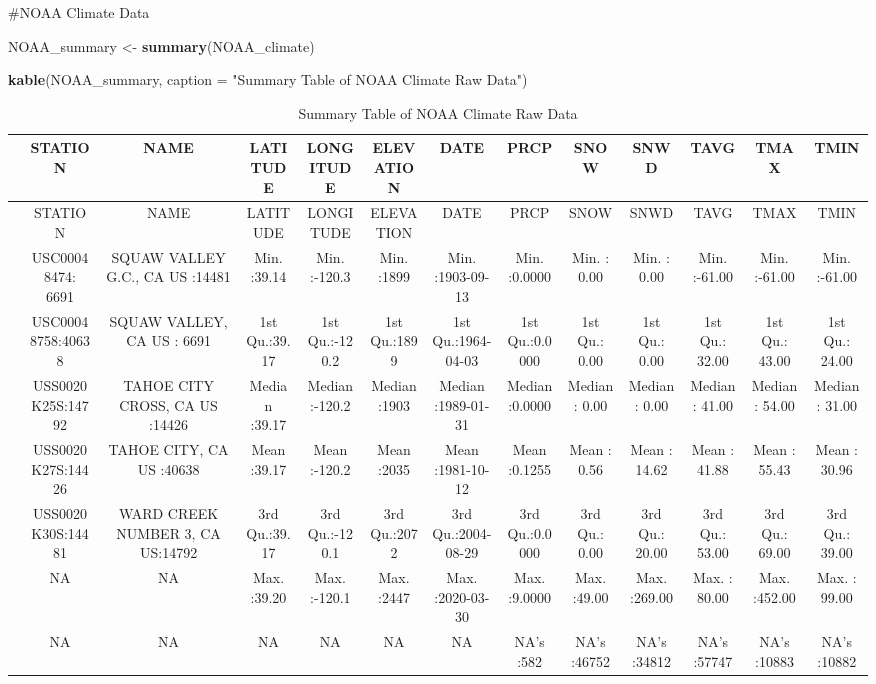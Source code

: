 \documentclass[]{article}
\newenvironment{Shaded}{\begin{snugshade}}{\end{snugshade}}
\newcommand{\DataTypeTok}[1]{\textcolor[rgb]{0.13,0.29,0.53}{#1}}
\newcommand{\KeywordTok}[1]{\textcolor[rgb]{0.13,0.29,0.53}{\textbf{#1}}}
\newcommand{\NormalTok}[1]{#1}
\newcommand{\StringTok}[1]{\textcolor[rgb]{0.31,0.60,0.02}{#1}}
\begin{document}
\#NOAA Climate Data

\begin{Shaded}
\begin{Highlighting}[]
\NormalTok{NOAA_summary <-}\StringTok{ }\KeywordTok{summary}\NormalTok{(NOAA_climate)}

\KeywordTok{kable}\NormalTok{(NOAA_summary, }\DataTypeTok{caption =} \StringTok{"Summary Table of NOAA Climate Raw Data"}\NormalTok{) }
\end{Highlighting}
\end{Shaded}

\begin{longtable}[]{@{}lcccccccccccc@{}}
\caption{Summary Table of NOAA Climate Raw Data}\tabularnewline
\toprule
& STATION & NAME & LATITUDE & LONGITUDE & ELEVATION & DATE & PRCP & SNOW
& SNWD & TAVG & TMAX & TMIN\tabularnewline
\midrule
\endfirsthead
\toprule
& STATION & NAME & LATITUDE & LONGITUDE & ELEVATION & DATE & PRCP & SNOW
& SNWD & TAVG & TMAX & TMIN\tabularnewline
\midrule
\endhead
& USC00048474: 6691 & SQUAW VALLEY G.C., CA US :14481 & Min. :39.14 &
Min. :-120.3 & Min. :1899 & Min. :1903-09-13 & Min. :0.0000 & Min. :
0.00 & Min. : 0.00 & Min. :-61.00 & Min. :-61.00 & Min.
:-61.00\tabularnewline
& USC00048758:40638 & SQUAW VALLEY, CA US : 6691 & 1st Qu.:39.17 & 1st
Qu.:-120.2 & 1st Qu.:1899 & 1st Qu.:1964-04-03 & 1st Qu.:0.0000 & 1st
Qu.: 0.00 & 1st Qu.: 0.00 & 1st Qu.: 32.00 & 1st Qu.: 43.00 & 1st Qu.:
24.00\tabularnewline
& USS0020K25S:14792 & TAHOE CITY CROSS, CA US :14426 & Median :39.17 &
Median :-120.2 & Median :1903 & Median :1989-01-31 & Median :0.0000 &
Median : 0.00 & Median : 0.00 & Median : 41.00 & Median : 54.00 & Median
: 31.00\tabularnewline
& USS0020K27S:14426 & TAHOE CITY, CA US :40638 & Mean :39.17 & Mean
:-120.2 & Mean :2035 & Mean :1981-10-12 & Mean :0.1255 & Mean : 0.56 &
Mean : 14.62 & Mean : 41.88 & Mean : 55.43 & Mean : 30.96\tabularnewline
& USS0020K30S:14481 & WARD CREEK NUMBER 3, CA US:14792 & 3rd Qu.:39.17 &
3rd Qu.:-120.1 & 3rd Qu.:2072 & 3rd Qu.:2004-08-29 & 3rd Qu.:0.0000 &
3rd Qu.: 0.00 & 3rd Qu.: 20.00 & 3rd Qu.: 53.00 & 3rd Qu.: 69.00 & 3rd
Qu.: 39.00\tabularnewline
& NA & NA & Max. :39.20 & Max. :-120.1 & Max. :2447 & Max. :2020-03-30 &
Max. :9.0000 & Max. :49.00 & Max. :269.00 & Max. : 80.00 & Max. :452.00
& Max. : 99.00\tabularnewline
& NA & NA & NA & NA & NA & NA & NA's :582 & NA's :46752 & NA's :34812 &
NA's :57747 & NA's :10883 & NA's :10882\tabularnewline
\bottomrule
\end{longtable}
\end{document}
